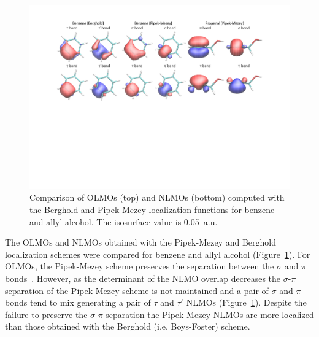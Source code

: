 \documentclass[aps,prl,reprint,amsmath,amssymb]{revtex4-1}
\begin{document}
\begin{figure}[htbp]
\centering
\includegraphics[scale=0.5]{boys_pipek.pdf}
\caption{Comparison of OLMOs (top) and NLMOs (bottom) computed with the Berghold and Pipek-Mezey localization functions for benzene and allyl alcohol. The isosurface value is 0.05~a.u.}
\label{fig:pipek}
\end{figure}

The OLMOs and NLMOs obtained with the Pipek-Mezey and Berghold localization schemes were compared for benzene and allyl alcohol (Figure~\ref{fig:pipek}). 
For OLMOs, the Pipek-Mezey scheme preserves the separation between the $\sigma$ and $\pi$ bonds~\cite{pipek1989fast}.
However, as the determinant of the NLMO overlap decreases the $\sigma$-$\pi$ separation of the Pipek-Mezey scheme is not maintained and a pair of $\sigma$ and $\pi$ bonds tend to mix generating a pair of $\tau$ and $\tau'$ NLMOs (Figure~\ref{fig:pipek}).  Despite the failure to preserve the $\sigma$-$\pi$ separation the Pipek-Mezey NLMOs are more localized than those obtained with the Berghold (i.e. Boys-Foster) scheme.
\end{document}
